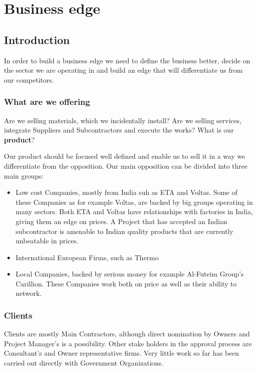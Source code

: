 \chapter{Business edge}

\section*{Introduction}

In order to build a business edge we need to define the business better, decide on the sector we are operating in and build an edge that will differentiate us from our competitors.

\subsection{What are we offering}
Are we selling materials, which we incidentally install? Are we selling services, integrate Suppliers and Subcontractors and execute the works? What is our \textbf{product}?

Our product should be focused well defined and enable us to sell it in a way we differentiate from the opposition.
Our main opposition can be divided into three main groups:

\begin{itemize}
\item Low cost Companies, mostly from India suh as ETA and Voltas. Some of these Companies as for example Voltas, are backed by big groups operating in many sectors. Both ETA and Voltas have relationships with factories in India, giving them an edge on prices. A Project that has accepted an Indian subcontractor is amenable to Indian quality products that are currently unbeatable in prices.
\item International European Firms, such as Thermo 
\item Local Companies, backed by serious money  for example Al-Futeim Group's Carillion. These Companies work both on price as well as their ability to network.
\end{itemize}

\subsection*{Clients}

Clients are mostly Main Contractors, although direct nomination by Owners and Project Manager's is a possibility. Other stake holders in the approval process are Consultant's and Owner representative firms. Very little work so far has been carried out directly with Government Organizations.

